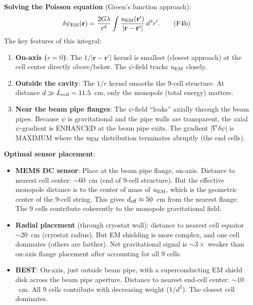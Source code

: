 \documentclass[11pt]{article}
\newcommand{\dpsi}{\delta\psi}
\theoremstyle{definition}
\theoremstyle{remark}
\begin{document}
\begin{tcolorbox}[colback=blue!5!white, colframe=blue!60!black,
  title=\textbf{W4i19 P2: DEEP REFINEMENT --- 5 KEY RESULTS}]
\begin{enumerate}
  \textbf{Solving the Poisson equation} (Green's function approach):
  \begin{equation}
  \dpsi_{\rm EM}(\mathbf{r}) = \frac{2G\lambda}{c^4}
  \int \frac{u_{\rm EM}(\mathbf{r}')}{|\mathbf{r} - \mathbf{r}'|}
  \,d^3r'.
  \tag{F4b}
  \end{equation}
  The key features of this integral:
  \begin{enumerate}[nosep]
  \item \textbf{On-axis ($r = 0$)}: The $1/|\mathbf{r} - \mathbf{r}'|$
    kernel is smallest (closest approach) at the cell center directly
    above/below. The $\psi$-field tracks $u_{\rm EM}$ closely.
  \item \textbf{Outside the cavity}: The $1/r$ kernel smooths the
    9-cell structure. At distance $d \gg L_{\rm cell} = 11.5$~cm,
    only the monopole (total energy) matters.
  \item \textbf{Near the beam pipe flanges}: The $\psi$-field
    ``leaks'' axially through the beam pipes. Because $\psi$ is
    gravitational and the pipe walls are transparent, the axial
    $\psi$-gradient is ENHANCED at the beam pipe exits. The gradient
    $|\nabla\dpsi|$ is MAXIMUM where the $u_{\rm EM}$ distribution
    terminates abruptly (the end cells).
  \end{enumerate}

  \textbf{Optimal sensor placement}:
  \begin{itemize}[nosep]
  \item \textbf{MEMS DC sensor}: Place at the beam pipe flange,
    on-axis. Distance to nearest cell center: $\sim 60$~cm
    (end of 9-cell structure). But the effective monopole distance
    is to the center of mass of $u_{\rm EM}$, which is the geometric
    center of the 9-cell string. This gives $d_{\rm eff} \approx
    50$~cm from the nearest flange. The 9 cells contribute coherently
    to the monopole gravitational field.
  \item \textbf{Radial placement} (through cryostat wall): distance
    to nearest cell equator $\sim 20$~cm (cryostat radius). But
    EM shielding is more complex, and one cell dominates (others
    are farther). Net gravitational signal is $\sim 3\times$ weaker
    than on-axis flange placement after accounting for all 9 cells.
  \item \textbf{BEST}: On-axis, just outside beam pipe, with
    a superconducting EM shield disk across the beam pipe aperture.
    Distance to nearest end-cell center: $\sim 10$~cm. All 9 cells
    contribute with decreasing weight ($1/d^2$). The closest cell
    dominates.
  \end{itemize}


\end{enumerate}
\end{tcolorbox}
\end{document}
